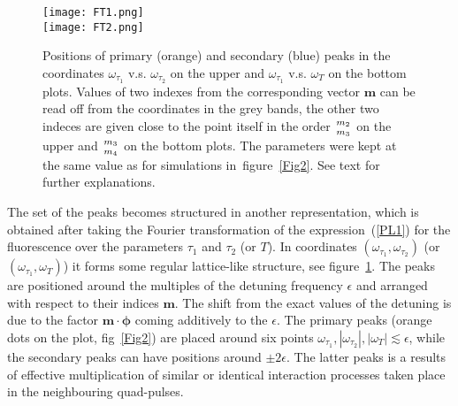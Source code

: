 \documentclass[prb,twocolumn,showpacs,epsfig,epsf]{revtex4}
\renewcommand{\atop}[2]{\genfrac{}{}{0pt}{}{#1}{#2}}
\newcommand{\abs}[1]{\left\vert#1\right\vert}
\newcommand{\1}{\mathds{1}}
\begin{document}
\begin{figure}[b]
\texttt{[image: FT1.png]}\vspace{-11pt}\\
\texttt{[image: FT2.png]}
\caption{\small Positions of primary (orange) and secondary (blue) peaks in the coordinates $\omega_{\tau_1}$ v.s. $\omega_{\tau_2}$ on the upper and $\omega_{\tau_1}$ v.s. $\omega_{T}$ on the bottom plots. Values of two indexes from the corresponding vector $\boldsymbol m$ can be read off from the coordinates in the grey bands, the other two indeces  are given close to the point itself in the order $\atop{m_2}{m_3}$ on the upper and $\atop{m_3}{m_4}$ on the bottom plots. The parameters were kept at the same value as for simulations in~figure~\ref{Fig2}. See text for further explanations.\label{Fig3}}
\end{figure}The set of the peaks becomes structured in another representation, which is obtained after taking the Fourier transformation of the expression~(\ref{PL1}) for the fluorescence over the parameters $\tau_1$ and $\tau_2$ (or $T$). In coordinates $(\omega_{\tau_1},\omega_{\tau_2})$ (or $(\omega_{\tau_1},\omega_{T})$) it forms some regular  lattice-like structure, see figure~\ref{Fig3}. The peaks are positioned around the multiples of the detuning frequency $\epsilon$ and arranged with respect to their indices $\boldsymbol m$. The shift from the exact values of the detuning is due to the factor $\boldsymbol m\cdot\boldsymbol \phi$ coming additively to the $\epsilon$. The primary peaks (orange dots on the plot, fig~\ref{Fig2}) are placed around six points $\omega_{\tau_1},\abs{\omega_{\tau_2}}, \abs{\omega_{T}}\lesssim \epsilon$, while the secondary peaks can have positions around $\pm 2\epsilon$. The latter peaks is a results of effective multiplication of similar or identical interaction processes taken place in the neighbouring quad-pulses. 
\end{document}
